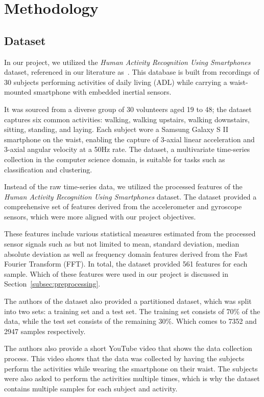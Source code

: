 \section{Methodology}\label{sec:methology}

\subsection{Dataset}\label{subsec:dataset}

In our project, we utilized the \emph{Human Activity Recognition Using Smartphones} dataset, referenced in our literature as~\cite{misc_human_activity_recognition_using_smartphones_240}.
This database is built from recordings of 30 subjects performing activities of daily living (ADL) while carrying a waist-mounted smartphone with embedded inertial sensors.

It was sourced from a diverse group of 30 volunteers aged 19 to 48; the dataset captures six common activities: walking, walking upstairs, walking downstairs, sitting, standing, and laying.
Each subject wore a Samsung Galaxy S II smartphone on the waist, enabling the capture of 3-axial linear acceleration and 3-axial angular velocity at a 50Hz rate.
The dataset, a multivariate time-series collection in the computer science domain, is suitable for tasks such as classification and clustering.

Instead of the raw time-series data, we utilized the processed features of the \emph{Human Activity Recognition Using Smartphones} dataset.
The dataset provided a comprehensive set of features derived from the accelerometer and gyroscope sensors, which were more aligned with our project objectives.

These features include various statistical measures estimated from the processed sensor signals such as but not limited to mean, standard deviation, median absolute deviation as well as frequency domain features derived from the Fast Fourier Transform (FFT).
In total, the dataset provided 561 features for each sample.
Which of these features were used in our project is discussed in Section~\ref{subsec:preprocessing}.

The authors of the dataset also provided a partitioned dataset, which was split into two sets: a training set and a test set.
The training set consists of 70\% of the data, while the test set consists of the remaining 30\%.
Which comes to 7352 and 2947 samples respectively.

The authors also provide a short YouTube video \cite{youtube_recording_of_the_experiment_240} that shows the data collection process.
This video shows that the data was collected by having the subjects perform the activities while wearing the smartphone on their waist.
The subjects were also asked to perform the activities multiple times, which is why the dataset contains multiple samples for each subject and activity.

